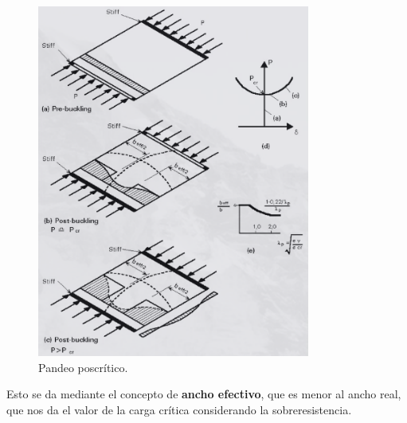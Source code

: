 \documentclass[../main.tex]{subfiles}
\begin{document}
\begin{figure}[htpb]
  \centering
  \includegraphics[width=0.8\textwidth]{../images/20210517/poscritico}
  \caption{Pandeo poscrítico.}
  \label{fig:poscritico}
\end{figure}

Esto se da mediante el concepto de \textbf{ancho efectivo}, que es menor al
ancho real, que nos da el valor de la carga crítica considerando la 
sobreresistencia.
\end{document}
